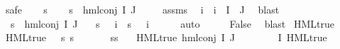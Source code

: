 \begin{isabellebody}
%
\isadelimproof
%
\endisadelimproof
%
\isatagproof
{}\isamarkupfalse%
{\isacharparenleft}{\kern0pt}safe{\isacharparenright}{\kern0pt}\isanewline
\ \ \isamarkupfalse%
\ s\isanewline
\ \ \isamarkupfalse%
\ {\isachardoublequoteopen}s\ {\isasymTurnstile}\ hml{\isacharunderscore}{\kern0pt}conj\ I\ J\ {\isasymPhi}{\isachardoublequoteclose}\isanewline
\ \ \isamarkupfalse%
\ assms\ \isamarkupfalse%
\ i\ \ {\isachardoublequoteopen}i\ {\isasymin}\ I\ {\isasyminter}\ J{\isachardoublequoteclose}\ \isamarkupfalse%
\ blast\isanewline
\ \ \isamarkupfalse%
\ {\isacartoucheopen}s\ {\isasymTurnstile}\ hml{\isacharunderscore}{\kern0pt}conj\ I\ J\ {\isasymPhi}{\isacartoucheclose}\ \isamarkupfalse%
\ {\isachardoublequoteopen}{\isacharparenleft}{\kern0pt}{\isacharparenleft}{\kern0pt}s\ {\isasymTurnstile}\ {\isacharparenleft}{\kern0pt}{\isasymPhi}\ i{\isacharparenright}{\kern0pt}{\isacharparenright}{\kern0pt}\ {\isasymand}\ {\isacharparenleft}{\kern0pt}{\isasymnot}{\isacharparenleft}{\kern0pt}s\ {\isasymTurnstile}\ {\isacharparenleft}{\kern0pt}{\isasymPhi}\ i{\isacharparenright}{\kern0pt}{\isacharparenright}{\kern0pt}{\isacharparenright}{\kern0pt}{\isacharparenright}{\kern0pt}{\isachardoublequoteclose}\isanewline
\ \ \ \ \isamarkupfalse%
\ auto\isanewline
\ \ \isamarkupfalse%
\ \isamarkupfalse%
\ False\ \isamarkupfalse%
\ blast\isanewline
{}\isamarkupfalse%
%
\endisatagproof
{\isafoldproof}%
%
\isadelimproof
\isanewline
%
\endisadelimproof
\isanewline
{}\isamarkupfalse%
\ HML{\isacharunderscore}{\kern0pt}true\ \isanewline
{\isachardoublequoteopen}HML{\isacharunderscore}{\kern0pt}true\ {\isasymphi}\ {\isasymequiv}\ {\isasymforall}s{\isachardot}{\kern0pt}\ s\ {\isasymTurnstile}\ {\isasymphi}{\isachardoublequoteclose}\isanewline
\isanewline
{}\isamarkupfalse%
\ \isanewline
\ \ \ s{\isacharcolon}{\kern0pt}{\isacharcolon}{\kern0pt}{\isacharprime}{\kern0pt}s\isanewline
\ \ \ {\isachardoublequoteopen}HML{\isacharunderscore}{\kern0pt}true\ {\isacharparenleft}{\kern0pt}hml{\isacharunderscore}{\kern0pt}conj\ I\ J\ {\isasymPhi}{\isacharparenright}{\kern0pt}{\isachardoublequoteclose}\isanewline
\ \ \ {\isachardoublequoteopen}{\isasymforall}{\isasymphi}\ {\isasymin}\ {\isasymPhi}\ {\isacharbackquote}{\kern0pt}\ I{\isachardot}{\kern0pt}\ HML{\isacharunderscore}{\kern0pt}true\ {\isasymphi}{\isachardoublequoteclose}\isanewline

\end{isabellebody}

